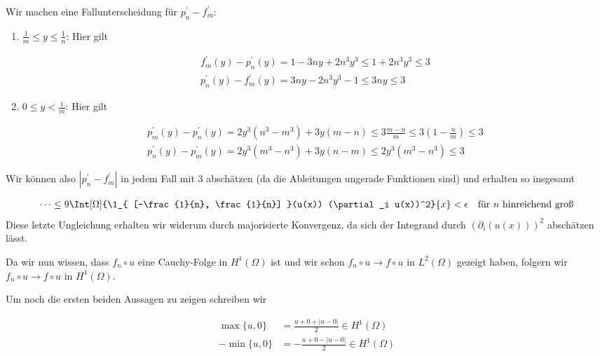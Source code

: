 \begin{solution}
Wir machen eine Fallunterscheidung für $p_n^\prime - f_m^\prime$:
\begin{enumerate}[label = \textbf{Fall \roman*:}]
  \item $\frac{1}{m} \leq y \leq \frac{1}{n}$: Hier gilt

    \begin{align*}
      f_m^\prime(y) - p_n^\prime(y)
      =
      1 - 3ny + 2n^3 y^3
      \leq
      1 + 2n^3 y^3
      \leq
      3 \\
      p_n^\prime(y) - f_m^\prime(y)
      =
      3ny - 2n^3 y^3 - 1
      \leq
      3ny
      \leq
      3
    \end{align*}

  \item $0 \leq y < \frac{1}{m}$: Hier gilt

    \begin{align*}
      p_m^\prime(y) - p_n^\prime(y)
      =
      2y^3(n^3-m^3) + 3y(m-n)
      \leq
      3 \frac{m-n}{m}
      \leq
      3 (1 - \frac{n}{m})
      \leq
      3 \\
      p_n^\prime(y) - p_m^\prime(y)
      =
      2y^3(m^3-n^3) + 3y(n-m)
      \leq
      2y^3(m^3-n^3)
      \leq
      3
    \end{align*}
\end{enumerate}

Wir können also $|p_n^\prime - f_m^\prime|$ in jedem Fall mit $3$ abschätzen (da die Ableitungen ungerade Funktionen sind) und erhalten so insgesamt

\begin{align*}
  \cdots
  \leq
  9 \Int[\Omega]{\1_{
    [-\frac{1}{n}, \frac{1}{n}]
    }(u(x)) (\partial_i u(x))^2}{x}
    <
    \epsilon \quad \text{für}~ n ~\text{hinreichend groß}
\end{align*}
Diese letzte Ungleichung erhalten wir widerum durch majorisierte Konvergenz, da sich der
Integrand durch $(\partial_i(u(x)))^2$ abschätzen lässt.

Da wir nun wissen, dass $f_n \circ u$ eine Cauchy-Folge in $H^1(\Omega)$ ist und wir schon
$f_n \circ u \rightarrow f \circ u$ in $L^2(\Omega)$ gezeigt haben, folgern wir $f_n \circ u \rightarrow f \circ u$ in $H^1(\Omega)$.

Um noch die ersten beiden Aussagen zu zeigen schreiben wir

\begin{align*}
  \max\{u,0\}
  &=
  \frac{u + 0 + |u - 0|}{2} \in H^1(\Omega) \\
  -\min\{u, 0\}
  &=
  -\frac{u + 0 - |u - 0|}{2} \in H^1(\Omega)
\end{align*}
\end{solution}

